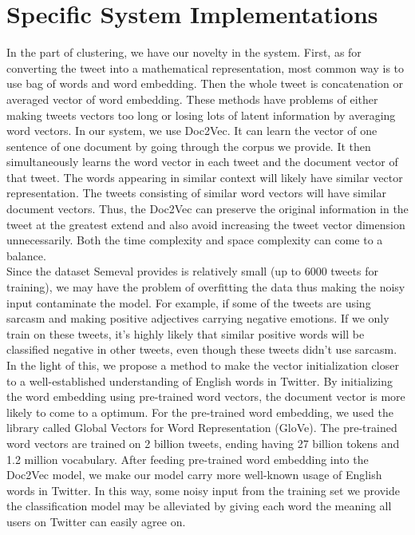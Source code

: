 \documentclass[conference]{IEEEtran}
\begin{document}
\section{Specific System Implementations}
In the part of clustering, we have our novelty in the system. First, as for converting the tweet into a mathematical representation, most common way is to use bag of words and word embedding. Then the whole tweet is concatenation or averaged vector of word embedding. These methods have problems of either making tweets vectors too long or losing lots of latent information by averaging word vectors. In our system, we use Doc2Vec. It can learn the vector of one sentence of one document by going through the corpus we provide. It then simultaneously learns the word vector in each tweet and the document vector of that tweet. The words appearing in similar context will likely have similar vector representation. The tweets consisting of similar word vectors will have similar document vectors. Thus, the Doc2Vec can preserve the original information in the tweet at the greatest extend and also avoid increasing the tweet vector dimension unnecessarily. Both the time complexity and space complexity can come to a balance.
\\ \indent
Since the dataset Semeval provides is relatively small (up to 6000 tweets for training), we may have the problem of overfitting the data thus making the noisy input contaminate the model. For example, if some of the tweets are using sarcasm and making positive adjectives carrying negative emotions. If we only train on these tweets, it's highly likely that similar positive words will be classified negative in other tweets, even though these tweets didn't use sarcasm. In the light of this, we propose a method to make the vector initialization closer to a well-established understanding of English words in Twitter. By initializing the word embedding using pre-trained word vectors, the document vector is more likely to come to a optimum. For the pre-trained word embedding, we used the library called Global Vectors for Word Representation (GloVe). The pre-trained word vectors are trained on 2 billion tweets, ending having 27 billion tokens and 1.2 million vocabulary. After feeding pre-trained word embedding into the Doc2Vec model, we make our model carry more well-known usage of English words in Twitter. In this way, some noisy input from the training set we provide the classification model may be alleviated by giving each word the meaning all users on Twitter can easily agree on.
\\ \indent
\end{document}
